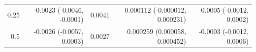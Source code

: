 \begin{tabular}{rrrrr}
0.25 & -0.0023 (-0.0046, -0.0001) & 0.0041 & 0.000112 (-0.000012, 0.000231) & -0.0005 (-0.0012, 0.0002) \\
0.5 & -0.0026 (-0.0057, 0.0003) & 0.0027 & 0.000259 (0.000058, 0.000452) & -0.0003 (-0.0012, 0.0006) \\

\end{tabular}
